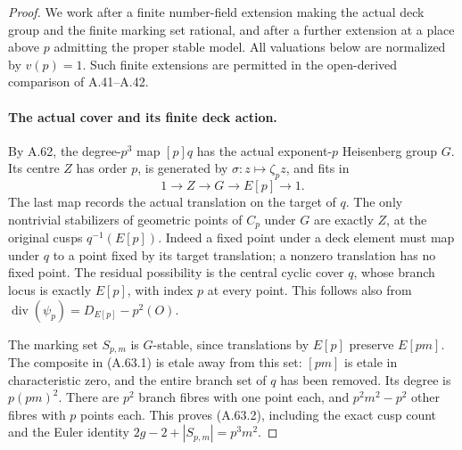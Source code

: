 \begin{proof}
We work after a finite number-field extension making the
actual deck group and the finite marking set rational, and
after a further extension at a place above \(p\) admitting
the proper stable model. All valuations below are normalized
by \(v(p)=1\). Such finite extensions are permitted in the
open-derived comparison of A.41--A.42.

\paragraph{The actual cover and its finite deck action.}
By A.62, the degree-\(p^3\) map \([p]q\) has the actual
exponent-\(p\) Heisenberg group \(G\). Its centre \(Z\)
has order \(p\), is generated by
\(\sigma:z\mapsto\zeta_pz\), and fits in
\[
 1\longrightarrow Z\longrightarrow G
       \longrightarrow E[p]\longrightarrow1.
                                                        \tag{A.63.3}
\]
The last map records the actual translation on the target of
\(q\). The only nontrivial stabilizers of geometric points
of \(C_p\) under \(G\) are exactly \(Z\), at the original
cusps \(q^{-1}(E[p])\). Indeed a fixed point under a deck
element must map under \(q\) to a point fixed by its target
translation; a nonzero translation has no fixed point.
The residual possibility is the central cyclic cover \(q\),
whose branch locus is exactly \(E[p]\), with index \(p\)
at every point. This follows also from
\(\operatorname{div}(\psi_p)=D_{E[p]}-p^2(O)\).

The marking set \(S_{p,m}\) is \(G\)-stable, since
translations by \(E[p]\) preserve \(E[pm]\).
The composite in (A.63.1) is etale away from this set:
\([pm]\) is etale in characteristic zero, and the entire
branch set of \(q\) has been removed. Its degree is
\(p(pm)^2\). There are \(p^2\) branch fibres with one
point each, and \(p^2m^2-p^2\) other fibres with \(p\)
points each. This proves (A.63.2), including the exact cusp
count and the Euler identity \(2g-2+|S_{p,m}|=p^3m^2\).


\end{proof}
